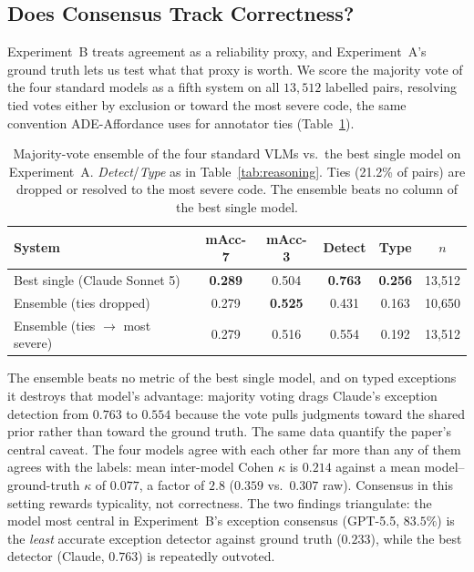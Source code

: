 \documentclass[runningheads]{llncs}
\begin{document}
\subsection{Does Consensus Track Correctness?}
\label{sec:consensus}

Experiment~B treats agreement as a reliability proxy, and Experiment~A's ground truth lets us test what that proxy is worth.
We score the majority vote of the four standard models as a fifth system on all $13{,}512$ labelled pairs, resolving tied votes either by exclusion or toward the most severe code, the same convention ADE-Affordance uses for annotator ties (Table~\ref{tab:ensemble}).

\begin{table}[t]
  \centering
  \footnotesize
  \caption{Majority-vote ensemble of the four standard VLMs vs.\ the best single model on Experiment~A. \emph{Detect}/\emph{Type} as in Table~\ref{tab:reasoning}. Ties (21.2\% of pairs) are dropped or resolved to the most severe code. The ensemble beats no column of the best single model.}
  \label{tab:ensemble}
  \begin{tabular}{lccccc}
    \toprule
    System & mAcc-7 & mAcc-3 & Detect & Type & $n$ \\
    \midrule
    Best single (Claude Sonnet 5)      & \textbf{0.289} & 0.504 & \textbf{0.763} & \textbf{0.256} & 13{,}512 \\
    Ensemble (ties dropped)            & 0.279 & \textbf{0.525} & 0.431 & 0.163 & 10{,}650 \\
    Ensemble (ties $\to$ most severe)  & 0.279 & 0.516 & 0.554 & 0.192 & 13{,}512 \\
    \bottomrule
  \end{tabular}
\end{table}

The ensemble beats no metric of the best single model, and on typed exceptions it destroys that model's advantage: majority voting drags Claude's exception detection from $0.763$ to $0.554$ because the vote pulls judgments toward the shared prior rather than toward the ground truth.
The same data quantify the paper's central caveat.
The four models agree with each other far more than any of them agrees with the labels: mean inter-model Cohen $\kappa$ is $0.214$ against a mean model--ground-truth $\kappa$ of $0.077$, a factor of $2.8$ ($0.359$ vs.\ $0.307$ raw).
Consensus in this setting rewards typicality, not correctness.
The two findings triangulate: the model most central in Experiment~B's exception consensus (GPT-5.5, $83.5\%$) is the \emph{least} accurate exception detector against ground truth ($0.233$), while the best detector (Claude, $0.763$) is repeatedly outvoted.
\end{document}
